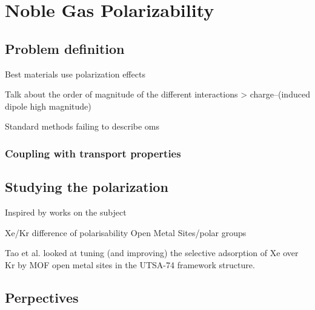 \documentclass[main]{subfiles}
\begin{document}
\section{Noble Gas Polarizability}

\subsection{Problem definition}

Best materials use polarization effects \autocite{Li_2019,Pei_2022}

Talk about the order of magnitude of the different interactions > charge--(induced dipole high magnitude)

Standard methods failing to describe oms\autocite{Perry_2014} 


\subsubsection{Coupling with transport properties}


\subsection{Studying the polarization}

Inspired by works on the subject\autocite{Lachet_1998,Becker_2017} 


Xe/Kr difference of polarisability
Open Metal Sites/polar groups

Tao et al.\autocite{Tao_2020} looked at tuning (and improving) the selective adsorption of Xe over Kr by MOF open metal sites in the UTSA-74 framework structure.


\subsection{Perpectives}

\OnlyInSubfile{\printglobalbibliography}
\end{document}
